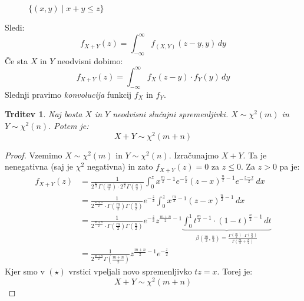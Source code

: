 \documentclass[12pt]{book}
\def\n{\noindent}
\theoremstyle{definition}
\theoremstyle{plain}
\theoremstyle{plain}
\newtheorem{trditev}{Trditev}
\theoremstyle{plain}
\theoremstyle{remark}
\begin{document}
\begin{zgled}
\begin{figure}[H]
    
        \caption{$\{(x,y)  \mid x+y \leq z\}$}
        \label{fig:7}
    \end{figure}
    
    \n Sledi: 
    $$
    f_{X+Y}(z)=\int_{-\infty}^{\infty} f_{(X, Y)}(z-y, y) \, d y
    $$
    Če sta $X$ in $Y$ neodvisni dobimo:
    $$
    f_{X+Y}(z)=\int_{-\infty}^{\infty} f_X(z-y) \cdot f_Y(y) \,d y
    $$
    Slednji pravimo \emph{konvolucija} funkcij $f_X$ in $f_Y$. 
\end{zgled}

\begin{trditev}
    Naj bosta $X$ in $Y$ neodvisni slučajni spremenljivki. $X \sim \chi^2(m)$ in $Y \sim \chi^2(n)$. Potem je: 
    $$
    X+Y \sim \chi^2(m+n)
    $$
\end{trditev}

\begin{proof}
    Vzemimo $X \sim \chi^2(m)$ in $Y \sim \chi^2(n)$. Izračunajmo $X+Y$. Ta je nenegativna (saj je $\chi^2$ negativna) in zato $f_{X+Y}(z)=0$ za $z \leq 0$. Za $z>0$ pa je: 
    \begin{align*}
        f_{X+Y}(z) &= \frac{1}{2^{\frac{m}{2}} \Gamma\left(\frac{m}{2}\right) \cdot 2^{\frac{n}{2}} \Gamma\left(\frac{n}{2}\right)} \int_0^{z} x^{\frac{m}{2}-1} e^{-\frac{x}{2}}(z-x)^{\frac{n}{2}-1} e^{-\frac{z-x}{2}} \, dx \\
        &=\frac{1}{2^{\frac{m+n}{2}} \cdot \Gamma\left(\frac{m}{2}\right) \Gamma\left(\frac{n}{2}\right)} e^{-\frac{z}{2}} \int_0^z x^{\frac{m}{2}-1}(z-x)^{\frac{n}{2}-1} \, d x \tag{$\star$} \\
        &=\frac{1}{2^{\frac{m+n}{2}} \cdot \Gamma\left(\frac{m}{2}\right) \Gamma\left(\frac{n}{2}\right)} e^{-\frac{z}{2}} z^{\frac{m+n}{2}-1} \underbrace{\int_0^1 t^{\frac{m}{2}-1} \cdot(1-t)^{\frac{n}{2}-1} \, d t}_{\beta(\frac{m}{2}, \frac{n}{2}) = \frac{\Gamma\left(\frac{m}{2}\right) \cdot \Gamma\left(\frac{n}{2}\right)}{\Gamma\left(\frac{m}{2}+\frac{n}{2}\right)}} \\
        &=\frac{1}{2^{\frac{m+n}{2}}\Gamma\left(\frac{m+n}{2}\right)} z^{\frac{m+n}{2}-1} e^{-\frac{z}{2}} 
    \end{align*}
    Kjer smo v $(\star)$ vrstici vpeljali novo spremenljivko $tz=x$. Torej je: 
    $$
    X+Y \sim \chi^2(m+n)
    $$
\end{proof}
\end{document}
